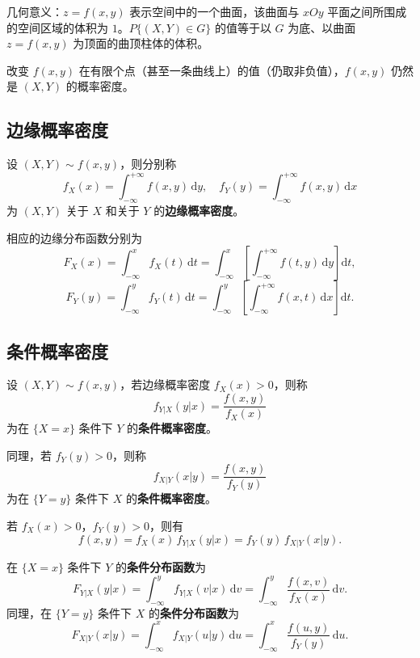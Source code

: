 \documentclass[lang=cn,11pt]{elegantbook}
\begin{document}
\begin{note}
几何意义：$z = f(x,y)$ 表示空间中的一个曲面，该曲面与 $xOy$ 平面之间所围成的空间区域的体积为 $1$。$P\{(X,Y) \in G\}$ 的值等于以 $G$ 为底、以曲面 $z = f(x,y)$ 为顶面的曲顶柱体的体积。

改变 $f(x,y)$ 在有限个点（甚至一条曲线上）的值（仍取非负值），$f(x,y)$ 仍然是 $(X,Y)$ 的概率密度。
\end{note}

\subsection{边缘概率密度}

\begin{definition}[边缘概率密度] \label{def:marginal-pdf}
设 $(X,Y) \sim f(x,y)$，则分别称
\[
f_X(x) = \int_{-\infty}^{+\infty}f(x,y)\,\mathrm{d}y, \quad f_Y(y) = \int_{-\infty}^{+\infty}f(x,y)\,\mathrm{d}x
\]
为 $(X,Y)$ 关于 $X$ 和关于 $Y$ 的\textbf{边缘概率密度}。
\end{definition}

相应的边缘分布函数分别为
\[
F_X(x) = \int_{-\infty}^{x}f_X(t)\,\mathrm{d}t = \int_{-\infty}^{x}\left[\int_{-\infty}^{+\infty}f(t,y)\,\mathrm{d}y\right]\mathrm{d}t,
\]
\[
F_Y(y) = \int_{-\infty}^{y}f_Y(t)\,\mathrm{d}t = \int_{-\infty}^{y}\left[\int_{-\infty}^{+\infty}f(x,t)\,\mathrm{d}x\right]\mathrm{d}t.
\]

\subsection{条件概率密度}

\begin{definition}[条件概率密度] \label{def:conditional-pdf}
设 $(X,Y) \sim f(x,y)$，若边缘概率密度 $f_X(x) > 0$，则称
\[
f_{Y|X}(y|x) = \frac{f(x,y)}{f_X(x)}
\]
为在 $\{X = x\}$ 条件下 $Y$ 的\textbf{条件概率密度}。

同理，若 $f_Y(y) > 0$，则称
\[
f_{X|Y}(x|y) = \frac{f(x,y)}{f_Y(y)}
\]
为在 $\{Y = y\}$ 条件下 $X$ 的\textbf{条件概率密度}。
\end{definition}

\begin{property}[概率密度乘法公式]\label{prop:pdf-multiplication}
若 $f_X(x) > 0$，$f_Y(y) > 0$，则有
\[
f(x,y) = f_X(x)\,f_{Y|X}(y|x) = f_Y(y)\,f_{X|Y}(x|y).
\]
\end{property}

\begin{definition}[条件分布函数]\label{def:conditional-df} 
在 $\{X=x\}$ 条件下 $Y$ 的\textbf{条件分布函数}为
\[
F_{Y|X}(y|x) = \int_{-\infty}^{y}f_{Y|X}(v|x)\,\mathrm{d}v = \int_{-\infty}^{y}\frac{f(x,v)}{f_X(x)}\,\mathrm{d}v.
\]
同理，在 $\{Y=y\}$ 条件下 $X$ 的\textbf{条件分布函数}为
\[
F_{X|Y}(x|y) = \int_{-\infty}^{x}f_{X|Y}(u|y)\,\mathrm{d}u = \int_{-\infty}^{x}\frac{f(u,y)}{f_Y(y)}\,\mathrm{d}u.
\]
\end{definition}
\end{document}
